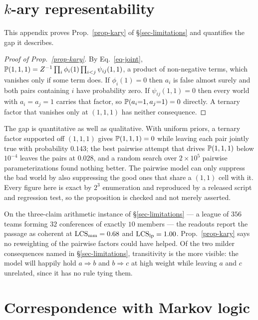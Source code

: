 \section{\texorpdfstring{$k$}{k}-ary representability}
\label{app-kary}

This appendix proves Prop.~\ref{prop-kary} of \S\ref{sec-limitations} and quantifies the gap it
describes.

\begin{proof}[Proof of Prop.~\ref{prop-kary}]
By Eq.~\ref{eq-joint}, $\mathbb{P}\!\left( 1,1,1 \right)=Z^{-1}\prod_i\phi_i(1)\prod_{i<j}\psi_{ij}(1,1)$, a product of
non-negative terms, which vanishes only if some term does. If $\phi_i(1)=0$ then $a_i$ is false almost
surely and both pairs containing $i$ have probability zero. If $\psi_{ij}(1,1)=0$ then every world with
$a_i=a_j=1$ carries that factor, so $\mathbb{P}\!\left( a_i{=}1,a_j{=}1 \right)=0$ directly. A ternary factor that vanishes
only at $(1,1,1)$ has neither consequence.
\end{proof}

The gap is quantitative as well as qualitative. With uniform priors, a ternary factor supported off
$(1,1,1)$ gives $\mathbb{P}\!\left( 1,1,1 \right)=0$ while leaving each pair jointly true with probability $0.143$; the best
pairwise attempt that drives $\mathbb{P}\!\left( 1,1,1 \right)$ below $10^{-4}$ leaves the pairs at $0.028$, and a random
search over $2\times10^{5}$ pairwise parameterizations found nothing better. The pairwise model can only
suppress the bad world by also suppressing the good ones that share a $(1,1)$ cell with it. Every figure
here is exact by $2^3$ enumeration and reproduced by a released script and regression test, so the
proposition is checked and not merely asserted.

On the three-claim arithmetic instance of \S\ref{sec-limitations} --- a league of $356$ teams forming
$32$ conferences of exactly $10$ members --- the readouts report the passage as coherent at
$\mathrm{LCS}_{\mathrm{mm}}=0.68$ and $\mathrm{LCS}_{\mathrm{lp}}=1.00$. Prop.~\ref{prop-kary} says no reweighting of the pairwise
factors could have helped. Of the two milder consequences named in \S\ref{sec-limitations},
transitivity is the more visible: the model will happily hold $a\Rightarrow b$ and $b\Rightarrow c$ at
high weight while leaving $a$ and $c$ unrelated, since it has no rule tying them.


\section{Correspondence with Markov logic}
\label{app-mln}

